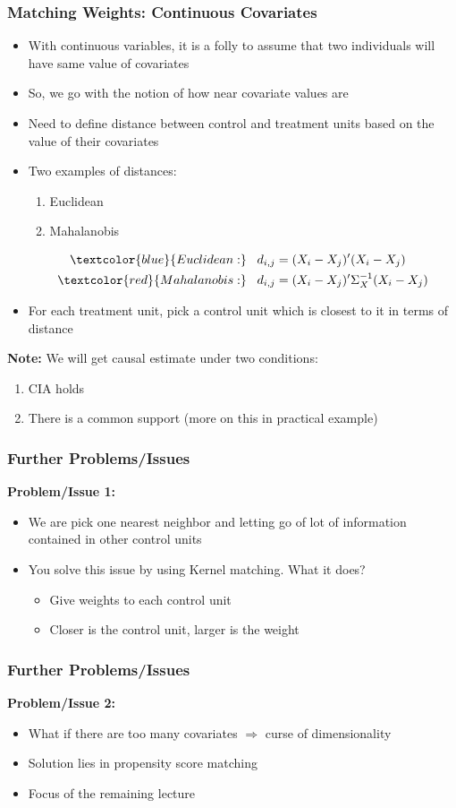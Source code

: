 \documentclass{beamer}
\theoremstyle{plain}
\begin{document}
\begin{frame}
	\frametitle{Matching Weights: Continuous Covariates}
	\begin{itemize}
		\item With continuous variables, it is a folly to assume that two individuals will have same value of covariates
		\item So, we go with the notion of how near covariate values are
		\item Need to define distance between control and treatment units based on the value of their covariates
		\item Two examples of distances:
			\begin{enumerate}
				\item Euclidean
				\item Mahalanobis
			\end{enumerate}
		\begin{align*}
			\textcolor{blue}{Euclidean:} & \;\;\; d_{i,j} = (X_i -  X_j)'(X_i - X_j)\\
			\textcolor{red}{Mahalanobis:} & \;\;\; d_{i,j} = (X_i -  X_j)'\Sigma_X^{-1}(X_i - X_j)
		\end{align*}
		\item For each treatment unit, pick a control unit which is closest to it in terms of distance
	\end{itemize}
\textbf{Note:} We will get causal estimate under two conditions:
	\begin{enumerate}
		\item CIA holds
		\item There is a common support (more on this in practical example)
	\end{enumerate}
\end{frame}

\begin{frame}
	\frametitle{Further Problems/Issues}
	\textbf{Problem/Issue 1:}
	\begin{itemize}
		\item We are pick one nearest neighbor and letting go of lot of information contained in other control units
		\item You solve this issue by using Kernel matching. What it does?
			\begin{itemize}
				\item Give weights to each control unit
				\item Closer is the control unit, larger is the weight
			\end{itemize}
	\end{itemize}
		\frametitle{Further Problems/Issues}
	\textbf{Problem/Issue 2:}
	\begin{itemize}
		\item What if there are too many covariates $\Rightarrow$ curse of dimensionality
		\item Solution lies  in propensity score matching
		\item Focus of the remaining lecture
	\end{itemize}
\end{frame}
\end{document}
